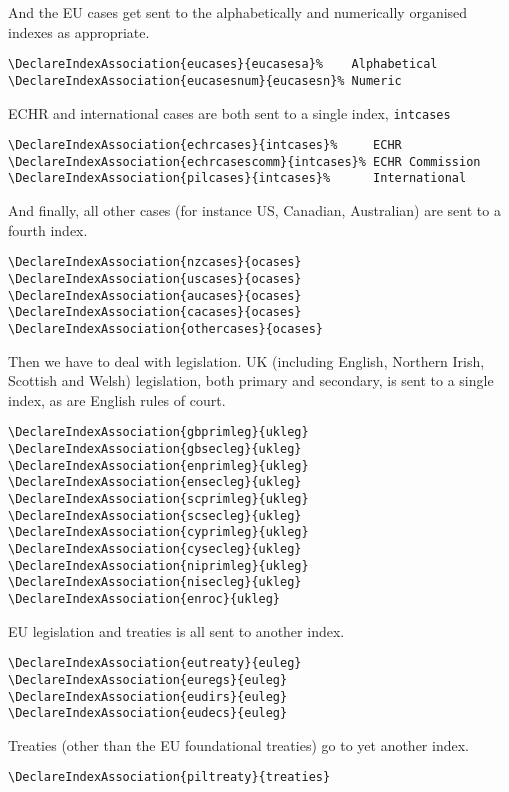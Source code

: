 \documentclass[a4paper,
               11pt,
	       DIV=1,			   
	       footinclude=false]
	      {scrartcl}
\begin{document}
And the EU cases get sent to the alphabetically and numerically organised indexes as appropriate.
\begin{verbatim}
\DeclareIndexAssociation{eucases}{eucasesa}%    Alphabetical
\DeclareIndexAssociation{eucasesnum}{eucasesn}% Numeric
\end{verbatim}

ECHR and international cases are both sent to a single index, \texttt{intcases}
\begin{verbatim}
\DeclareIndexAssociation{echrcases}{intcases}%     ECHR
\DeclareIndexAssociation{echrcasescomm}{intcases}% ECHR Commission
\DeclareIndexAssociation{pilcases}{intcases}%      International
\end{verbatim}

And finally, all other cases (for instance US, Canadian, Australian) are sent to a fourth index.

\begin{verbatim}
\DeclareIndexAssociation{nzcases}{ocases}
\DeclareIndexAssociation{uscases}{ocases}
\DeclareIndexAssociation{aucases}{ocases}
\DeclareIndexAssociation{cacases}{ocases}
\DeclareIndexAssociation{othercases}{ocases}
\end{verbatim}

Then we have to deal with legislation. UK (including English, Northern Irish, Scottish and Welsh) legislation, both primary and secondary, is sent to a single index, as are English rules of court.
\begin{verbatim}
\DeclareIndexAssociation{gbprimleg}{ukleg}
\DeclareIndexAssociation{gbsecleg}{ukleg}
\DeclareIndexAssociation{enprimleg}{ukleg}
\DeclareIndexAssociation{ensecleg}{ukleg}
\DeclareIndexAssociation{scprimleg}{ukleg}
\DeclareIndexAssociation{scsecleg}{ukleg}
\DeclareIndexAssociation{cyprimleg}{ukleg}
\DeclareIndexAssociation{cysecleg}{ukleg}
\DeclareIndexAssociation{niprimleg}{ukleg}
\DeclareIndexAssociation{nisecleg}{ukleg}
\DeclareIndexAssociation{enroc}{ukleg}
\end{verbatim}

EU legislation and treaties is all sent to another index.
\begin{verbatim}
\DeclareIndexAssociation{eutreaty}{euleg}
\DeclareIndexAssociation{euregs}{euleg}
\DeclareIndexAssociation{eudirs}{euleg}
\DeclareIndexAssociation{eudecs}{euleg}
\end{verbatim}

Treaties (other than the EU foundational treaties) go to yet another index.

\begin{verbatim}
\DeclareIndexAssociation{piltreaty}{treaties}
\end{verbatim}
\end{document}
